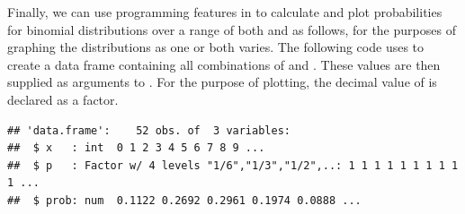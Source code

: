 \documentclass[11pt]{book}
\renewenvironment{knitrout}{\small\renewcommand{\baselinestretch}{.85}}{} %
\begin{document}
Finally, we can use programming features in \R to calculate and plot
probabilities for binomial distributions over a range of
both  and  as follows, for the purposes of
graphing the distributions as one or both varies.
The following code uses  to create a data frame 
containing all combinations of  and 
. These values are then supplied as
arguments to .  For the purpose of plotting,
the decimal value of  is declared as a factor.

\begin{knitrout}
\color{fgcolor}\begin{kframe}
\begin{alltt}
 \hlkwb{<-}\hlstd{(}\hlstd{=}\hlopt{:}\hlstd{,} \hlstd{=}\hlstd{(}\hlopt{/}\hlstd{,} \hlopt{/}\hlstd{,} \hlopt{/}\hlstd{,} \hlopt{/}\hlstd{))}
 \hlkwb{<-}  \hlstd{=}\hlstd{(XP[,}\hlstd{],} \hlstd{, XP[,}\hlstd{]))}
\hlopt{$} \hlkwb{<-} \hlopt{$} \hlstd{=}\hlstd{(}\hlstd{,} \hlstd{,} \hlstd{,} \hlstd{))}
\end{alltt}
\begin{verbatim}
## 'data.frame':	52 obs. of  3 variables:
##  $ x   : int  0 1 2 3 4 5 6 7 8 9 ...
##  $ p   : Factor w/ 4 levels "1/6","1/3","1/2",..: 1 1 1 1 1 1 1 1 1 1 ...
##  $ prob: num  0.1122 0.2692 0.2961 0.1974 0.0888 ...
\end{verbatim}
\end{kframe}
\end{knitrout}
\end{document}
